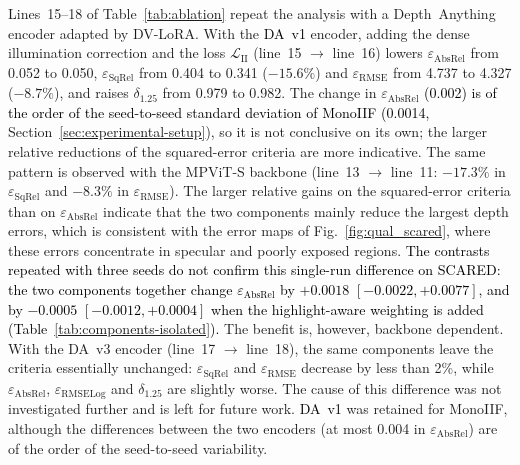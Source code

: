 \documentclass[a4paper,fleqn]{cas-dc}
\begin{document}
{{Lines~15--18 of Table~\ref{tab:ablation} repeat the analysis with a Depth~Anything encoder adapted by DV-LoRA. With the \textcolor{black}{DA~v1} encoder, adding the dense illumination correction and the loss $\mathcal{L}_\textrm{II}$ (line~15 $\rightarrow$ line~16) lowers $\varepsilon_\textrm{AbsRel}$ from 0.052 to 0.050, $\varepsilon_\textrm{SqRel}$ from 0.404 to 0.341 ($-15.6\%$) and $\varepsilon_\textrm{RMSE}$ from 4.737 to 4.327 ($-8.7\%$), and raises $\delta_{1.25}$ from 0.979 to 0.982. The change in $\varepsilon_\textrm{AbsRel}$ \textcolor{black}{(0.002) is of the order of the seed-to-seed standard deviation of MonoIIF (0.0014,} Section~\ref{sec:experimental-setup}), so it is not conclusive on its own; the larger relative reductions of the squared-error criteria are more indicative. The same pattern is observed with the MPViT-S backbone (line~13 $\rightarrow$ line~11: $-17.3\%$ in $\varepsilon_\textrm{SqRel}$ and $-8.3\%$ in $\varepsilon_\textrm{RMSE}$). The larger relative gains on the squared-error criteria than on $\varepsilon_\textrm{AbsRel}$ indicate that the two components mainly reduce the largest depth errors, which is consistent with the error maps of Fig.~\ref{fig:qual_scared}, where these errors concentrate in specular and poorly exposed regions. \textcolor{black}{The contrasts repeated with three seeds do not confirm this single-run difference on SCARED: the two components together change $\varepsilon_\textrm{AbsRel}$ by $+0.0018$ $[-0.0022, +0.0077]$, and by $-0.0005$ $[-0.0012, +0.0004]$ when the highlight-aware weighting is added (Table~\ref{tab:components-isolated}).}
The benefit is, however, backbone dependent. With the DA~v3 encoder (line~17 $\rightarrow$ line~18), the same components leave the criteria essentially unchanged: $\varepsilon_\textrm{SqRel}$ and $\varepsilon_\textrm{RMSE}$ decrease by less than 2\%, while $\varepsilon_\textrm{AbsRel}$, $\varepsilon_\textrm{RMSELog}$ and $\delta_{1.25}$ are slightly worse. The cause of this difference was not investigated further and is left for future work. \textcolor{black}{DA~v1} was retained for MonoIIF, although the differences between the two encoders (at most 0.004 in $\varepsilon_\textrm{AbsRel}$) are of the order of the seed-to-seed variability.}

}
\end{document}
